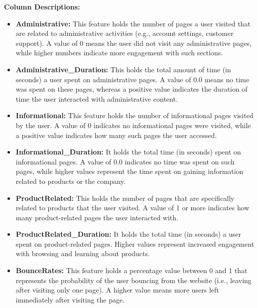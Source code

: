 \documentclass[12pt]{article}
\begin{document}
\vspace{0.5cm}

\textbf{Column Descriptions:}

\begin{itemize}
    \item \textbf{Administrative:} This feature holds the number of pages a user visited that are related to administrative activities (e.g., account settings, customer support). A value of 0 means the user did not visit any administrative pages, while higher numbers indicate more engagement with such sections.
    
    \item \textbf{Administrative\_Duration:} This holds the total amount of time (in seconds) a user spent on administrative pages. A value of 0.0 means no time was spent on these pages, whereas a positive value indicates the duration of time the user interacted with administrative content.

    \item \textbf{Informational:} This feature holds the number of informational pages visited by the user. A value of 0 indicates no informational pages were visited, while a positive value indicates how many such pages the user accessed.

\item \textbf{Informational\_Duration:} It holds the total time (in seconds) spent on informational pages. A value of 0.0 indicates no time was spent on such pages, while higher values represent the time spent on gaining information related to products or the company.

    
    \item \textbf{ProductRelated:} This holds the number of pages that are specifically related to products that the user visited. A value of 1 or more indicates how many product-related pages the user interacted with.

\item \textbf{ProductRelated\_Duration:} It holds the total time (in seconds) a user spent on product-related pages. Higher values represent increased engagement with browsing and learning about products.

\item \textbf{BounceRates:} This feature holds a percentage value between 0 and 1 that represents the probability of the user bouncing from the website (i.e., leaving after visiting only one page). A higher value means more users left immediately after visiting the page.


\end{itemize}
\end{document}
